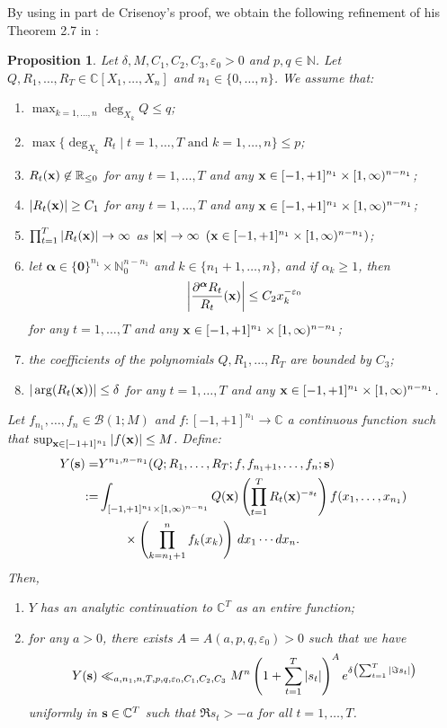 \documentclass[a4paper,12pt]{article}
\newtheorem{prop}[thm]{Proposition}
\theoremstyle{definition}
\numberwithin{equation}{section}
\def\N{{\mathbb N}}
\def\R{{\mathbb R}}
\def\C{{\mathbb C}}
\def\s{{\bf s}}
\def\x{{\bf x}}
\newcommand{\zerob}{\boldsymbol{0}}
\newcommand{\alphab}{\boldsymbol{\alpha}}
\newcommand{\dd}{d}
\newcommand{\phie}{e}
\def\eps{{\varepsilon}}
\begin{document}
By using in part de Crisenoy's proof, we obtain the following refinement of his Theorem 2.7 in \cite{dC}:
\begin{prop}\label{Integralmoderategrowth}
Let $\delta, M, C_1, C_2, C_3,\eps_0>0$ and $p,q \in \N$.
Let $Q, R_1,\ldots, R_T\in \C[X_1,\ldots, X_n]$ and 
$n_1\in \{0,\ldots, n\}$. We assume that:
\begin{enumerate}[label=(\roman*)]
\item $\max_{k=1,\ldots, n} \deg_{X_k} Q \leq q$;
\item $\max \{ \deg_{X_k }R_t \mid t=1,\ldots, T \text{ and }
k=1,\ldots, n\} \leq p$;
\item $R_t(\x) \not \in \R_{\leq 0}$
for any $t=1,\ldots, T$ and any $\x \in [-1,+1]^{n_1}\times [1,\infty)^{n-n_1}$;
\item $|R_t(\x)| \geq C_1$ for any $t=1,\ldots,T$ and
 any $\x \in [-1,+1]^{n_1}\times [1,\infty)^{n-n_1}$;
\item $\prod_{t=1}^T |R_t(\x) | \to \infty$ as $|\x|\to \infty$ $(\x \in [-1,+1]^{n_1}\times [1,\infty)^{n-n_1})$;
\item let $\alphab \in \{\zerob\}^{n_1}\times \N_0^{n-n_1}$ and $k\in \{n_1+1,\ldots,n\}$, and if $\alpha_k \geq 1$, then 
$$\left|\frac{\partial^{\alphab} R_t}{R_t} (\x)\right| \leq C_2 x_k^{-\eps_0}$$
for any $t=1, \ldots,T$ and any $\x \in [-1,+1]^{n_1}\times [1,\infty)^{n-n_1}$;
\item the coefficients of the polynomials $Q, R_1,\ldots, R_T$ are bounded by $C_3$;
\item $|\arg (R_t(\x))| \leq \delta$
for any $t=1,\ldots, T$ and any $\x \in [-1,+1]^{n_1}\times [1,\infty)^{n-n_1}$.  
\end{enumerate}
Let $f_{n_1},\ldots, f_n \in \mathcal B(1; M)$ and $f:[-1,+1]^{n_1}\to \C$ a continuous function such that $\sup_{\x\in [-1+1]^{n_1}}|f(\x)|\leq M$. Define:
\begin{align*}
Y(\s)=&Y^{n_1, n-n_1}(Q; R_1,\ldots, R_T;f, f_{n_1+1},\ldots,f_n; \s)\\
:=& \int_{ [-1,+1]^{n_1}\times [1,\infty)^{n-n_1}}Q(\x) \left(\prod_{t=1}^T R_t(\x)^{-s_t}\right) 
f(x_1,\ldots, x_{n_1})\\
& \qquad \times \left(\prod_{k=n_1+1}^n f_k (x_k)\right) \, \dd x_1\cdots \dd x_n.
\end{align*}
Then, 
\begin{enumerate}
\item $Y$ has an analytic continuation to $\C^T$ as an entire function;
\item for any $a>0$, there exists  $A=A(a,p,q, \eps_0)>0$ such that we have 
\begin{equation}\label{crucialestimate}
Y(\s) \ll_{a,n_1,n, T, p, q, \eps_0, C_1, C_2, C_3} M^n \left(1+\sum_{t=1}^T |s_t| \right)^A \phie^{\delta \left(\sum_{t=1}^T |\Im s_t|\right)}
\end{equation}
uniformly in $\s \in \C^T$ such that $\Re s_t >-a$ for all $t=1,\ldots,T$.
\end{enumerate}
\end{prop}
\end{document}
